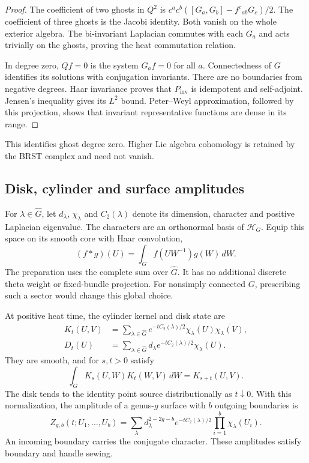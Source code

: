 \begin{proof}
The coefficient of two ghosts in $Q^2$ is
$c^ac^b([G_a,G_b]-f^c{}_{ab}G_c)/2$.
The coefficient of three ghosts is the Jacobi identity.
Both vanish on the whole exterior algebra.
The bi-invariant Laplacian commutes with each $G_a$ and acts
trivially on the ghosts, proving the heat commutation relation.

In degree zero, $Qf=0$ is the system $G_af=0$ for all $a$.
Connectedness of $G$ identifies its solutions with conjugation
invariants. There are no boundaries from negative degrees.
Haar invariance proves that $P_{\mathrm{inv}}$ is idempotent
and self-adjoint. Jensen's inequality gives its $L^2$ bound.
Peter--Weyl approximation, followed by this projection, shows
that invariant representative functions are dense in its range.
\end{proof}

This identifies ghost degree zero. Higher Lie algebra cohomology
is retained by the BRST complex and need not vanish.

\subsection{Disk, cylinder and surface amplitudes}

For $\lambda\in\widehat G$, let $d_\lambda$, $\chi_\lambda$
and $C_2(\lambda)$ denote its dimension, character and positive
Laplacian eigenvalue. The characters are an orthonormal basis
of $\mathcal H_G$. Equip this space on its smooth core with
Haar convolution,
\[
 (f*g)(U)=\int_G f(UW^{-1})g(W)\,dW.
\]
The preparation uses the complete sum over $\widehat G$.
It has no additional discrete theta weight or fixed-bundle
projection. For nonsimply connected $G$, prescribing such a
sector would change this global choice.

\begin{theorem}\label{mht:thm:residual-character-sewing}
At positive heat time, the cylinder kernel and disk state are
\begin{align}
 K_t(U,V)&=\sum_{\lambda\in\widehat G}
 e^{-tC_2(\lambda)/2}\chi_\lambda(U)\overline{\chi_\lambda(V)},
       \label{mht:eq:residual-cylinder}\\
 D_t(U)&=\sum_{\lambda\in\widehat G}
 d_\lambda e^{-tC_2(\lambda)/2}\chi_\lambda(U).
       \label{mht:eq:residual-disk}
\end{align}
They are smooth, and for $s,t>0$ satisfy
\begin{equation}\label{mht:eq:residual-cylinder-sewing}
 \int_GK_s(U,W)K_t(W,V)\,dW=K_{s+t}(U,V).
\end{equation}
The disk tends to the identity point source distributionally
as $t\downarrow0$. With this normalization, the amplitude
of a genus-$g$ surface with $b$ outgoing boundaries is
\begin{equation}\label{mht:eq:residual-surface-amplitude}
 Z_{g,b}(t;U_1,\ldots,U_b)
 =\sum_\lambda d_\lambda^{2-2g-b}e^{-tC_2(\lambda)/2}
                      \prod_{i=1}^b\chi_\lambda(U_i).
\end{equation}
An incoming boundary carries the conjugate character.
These amplitudes satisfy boundary and handle sewing.
\end{theorem}


